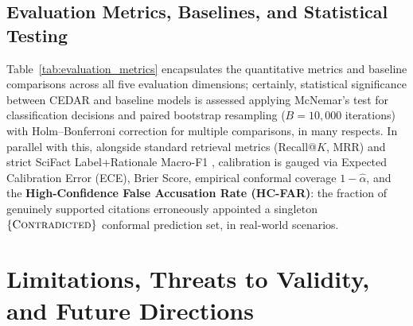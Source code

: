 \documentclass[sigconf]{acmart}
\begin{document}
\subsection{Evaluation Metrics, Baselines, and Statistical Testing}
Table~\ref{tab:evaluation_metrics} encapsulates the quantitative metrics and baseline comparisons across all five evaluation dimensions; certainly, statistical significance between CEDAR and baseline models is assessed applying McNemar's test for classification decisions and paired bootstrap resampling ($B = 10{,}000$ iterations) with Holm--Bonferroni correction for multiple comparisons, in many respects. In parallel with this, alongside standard retrieval metrics (Recall@$K$, MRR) and strict SciFact Label+Rationale Macro-F1 \cite{wadden2020fact}, calibration is gauged via Expected Calibration Error (ECE), Brier Score, empirical conformal coverage $1-\hat{\alpha}$, and the \textbf{High-Confidence False Accusation Rate (HC-FAR)}: the fraction of genuinely supported citations erroneously appointed a singleton $\{\textsc{Contradicted}\}$ conformal prediction set, in real-world scenarios.

\section{Limitations, Threats to Validity, and Future Directions}
\label{sec:limitations}
\end{document}
